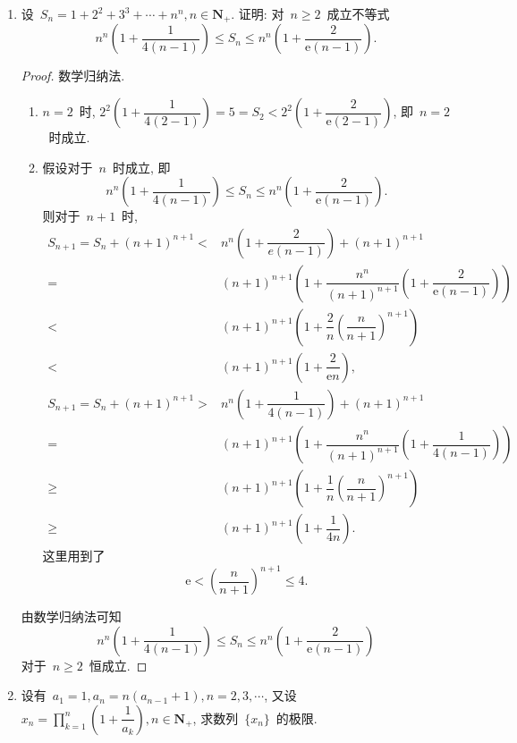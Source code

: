 \documentclass[UTF8,a4paper,10pt,twoside]{book}
\newcommand{\e}{\mathrm e}
\begin{document}
\begin{enumerate}
	\item 设~$S_n=1+2^2+3^3+\cdots+n^n, n\in\mathbf{N}_{+}$. 证明: 对~$n\geqslant 2$~成立不等式
	      \[
		      n^n\left(1+\dfrac{1}{4(n-1)}\right)\leqslant S_n\leqslant n^n\left(1+\dfrac{2}{\e(n-1)}\right).
	      \]
	      \begin{proof}
		      数学归纳法.
		      \begin{enumerate}[(1)]
			      \item $n=2$~时, $2^2\left(1+\dfrac{1}{4(2-1)}\right)=5=S_2<2^2\left(1+\dfrac{2}{\e(2-1)}\right)$, 即~$n=2$~时成立.
			      \item 假设对于~$n$~时成立, 即
			            \[
				            n^n\left(1+\dfrac{1}{4(n-1)}\right)\leqslant S_n\leqslant n^n\left(1+\dfrac{2}{\e(n-1)}\right).
			            \]
			            则对于~$n+1$~时,
			            \[
				            \begin{split}
					            S_{n+1}=S_n+(n+1)^{n+1}<&n^n\left(1+\dfrac{2}{e(n-1)}\right)+(n+1)^{n+1}\\
					            =&(n+1)^{n+1}\left(1+\dfrac{n^n}{(n+1)^{n+1}}\left(1+\dfrac{2}{\e(n-1)}\right)\right)\\
					            <&(n+1)^{n+1}\left(1+\dfrac{2}{n}\left(\dfrac{n}{n+1}\right)^{n+1}\right)\\
					            <&(n+1)^{n+1}\left(1+\dfrac{2}{\e n}\right),\\
					            S_{n+1}=S_n+(n+1)^{n+1}>&n^n\left(1+\dfrac{1}{4(n-1)}\right)+(n+1)^{n+1}\\
					            =&(n+1)^{n+1}\left(1+\dfrac{n^n}{(n+1)^{n+1}}\left(1+\dfrac{1}{4(n-1)}\right)\right)\\
					            \geqslant&(n+1)^{n+1}\left(1+\dfrac{1}{n}\left(\dfrac{n}{n+1}\right)^{n+1}\right)\\
					            \geqslant&(n+1)^{n+1}\left(1+\dfrac{1}{4n}\right).
				            \end{split}
			            \]
			            这里用到了
			            \[
				            \e<\left(\dfrac{n}{n+1}\right)^{n+1}\leqslant 4.
			            \]
		      \end{enumerate}
		      由数学归纳法可知
		      \[
			      n^n\left(1+\dfrac{1}{4(n-1)}\right)\leqslant S_n\leqslant n^n\left(1+\dfrac{2}{\e(n-1)}\right)
		      \]
		      对于~$n\geqslant 2$~恒成立.\qedhere
	      \end{proof}
	\item 设有~$a_1=1,a_n=n(a_{n-1}+1), n=2,3,\cdots$, 又设~$x_n=\prod\limits_{k=1}^n\left(1+\dfrac{1}{a_k}\right), n\in\mathbf{N}_{+}$, 求数列~$\{x_n\}$~的极限.

\end{enumerate}
\end{document}
